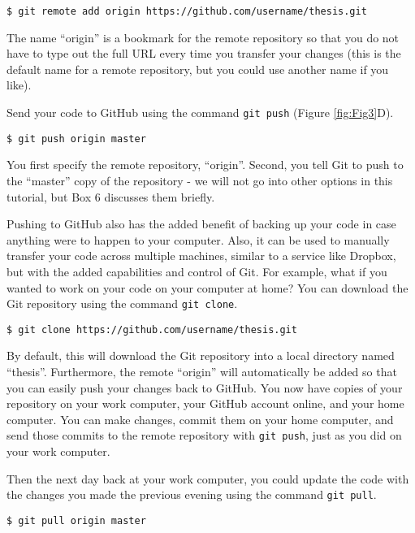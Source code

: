 \begin{verbatim}
$ git remote add origin https://github.com/username/thesis.git
\end{verbatim}

The name ``origin'' is a bookmark for the remote repository so that you do not have to type out the full URL every time you transfer your changes (this is the default name for a remote repository, but you could use another name if you like).

Send your code to GitHub using the command \verb|git push| (Figure \ref{fig:Fig3}D).

\begin{verbatim}
$ git push origin master
\end{verbatim}

You first specify the remote repository, ``origin''.
Second, you tell Git to push to the ``master'' copy of the repository - we will not go into other options in this tutorial, but Box 6 discusses them briefly.

Pushing to GitHub also has the added benefit of backing up your code in case anything were to happen to your computer.
Also, it can be used to manually transfer your code across multiple machines, similar to a service like Dropbox, but with the added capabilities and control of Git.
For example, what if you wanted to work on your code on your computer at home?
You can download the Git repository using the command \verb|git clone|.

\begin{verbatim}
$ git clone https://github.com/username/thesis.git
\end{verbatim}

By default, this will download the Git repository into a local directory named ``thesis''.
Furthermore, the remote ``origin'' will automatically be added so that you can easily push your changes back to GitHub.
You now have copies of your repository on your work computer, your GitHub account online, and your home computer.
You can make changes, commit them on your home computer, and send those commits to the remote repository with \verb|git push|, just as you did on your work computer.

Then the next day back at your work computer, you could update the code with the changes you made the previous evening using the command \verb|git pull|.

\begin{verbatim}
$ git pull origin master
\end{verbatim}

